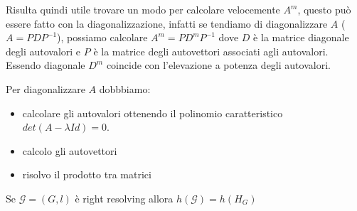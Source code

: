 Risulta quindi utile trovare un modo per calcolare velocemente $A^m$, questo può
essere fatto con la diagonalizzazione, infatti se tendiamo di diagonalizzare $A$ ($A=PDP^{-1}$),
possiamo calcolare $A^m=PD^{m}P^{-1}$ dove $D$ è la matrice diagonale degli autovalori
e $P$ è la matrice degli autovettori associati agli autovalori. Essendo diagonale 
$D^m$ coincide con l'elevazione a potenza degli autovalori.

Per diagonalizzare $A$ dobbbiamo:
\begin{itemize}
    \item calcolare gli autovalori ottenendo il polinomio caratteristico $det(A-\lambda Id) =0$.
    \item calcolo gli autovettori
    \item risolvo il prodotto tra matrici
\end{itemize}

\begin{teorema}
    Se $\mathcal{G}= (G,l)$ è right resolving allora $h(\mathcal{G}) = h(H_G)$
\end{teorema}

